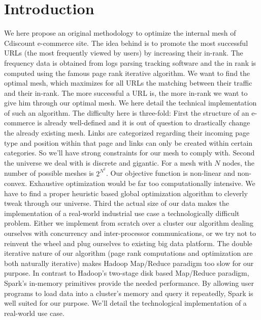 \documentclass{iSWAGArticle}
\begin{document}
\section{Introduction}
We here propose an original methodology to optimize the internal mesh of Cdiscount e-commerce site.
The idea behind is to promote the most successful URLs (the most frequently viewed by users) by increasing their in-rank.  
The frequency data is obtained from logs parsing tracking software and 
the in rank is computed using the famous page rank iterative algorithm.  
We want to find the optimal mesh, which maximizes for all URLs the matching between their traffic and their in-rank. 
The more successful a URL is, the more in-rank we want to give him through our optimal mesh.
We here detail the technical implementation of such an algorithm.
The difficulty here is three-fold:
First the structure of an e-commerce is already well-defined and it is out of question to drastically change the already existing mesh.
Links are categorized regarding their incoming page type and position within that page and links can only be created within certain categories. 
So we'll have strong constraints for our mesh to comply with.
Second the universe we deal with is discrete and gigantic. 
For a mesh with $N$ nodes, the number of possible meshes is $2^{N^{2}}$. 
Our objective function is non-linear and non-convex. Exhaustive optimization would be far too computationally intensive. 
We have to find a proper heuristic based global optimization algorithm to cleverly tweak through our universe.
Third the actual size of our data makes the implementation of a real-world industrial use case a technologically difficult problem.
Either we implement from scratch over a cluster our algorithm dealing ourselves with concurrency and inter-processor communications,
or we try not to reinvent the wheel and plug ourselves to existing big data platform.
The double iterative nature of our algorithm (page rank computations and optimization are both naturally iterative)
makes Hadoop Map/Reduce paradigm too slow for our purpose. 
In contrast to Hadoop's two-stage disk based Map/Reduce paradigm, Spark's in-memory primitives provide the needed performance.
By allowing user programs to load data into a cluster's memory and query it repeatedly, Spark is well suited for our purpose.
We'll detail the technological implementation of a real-world use case.
\end{document}
